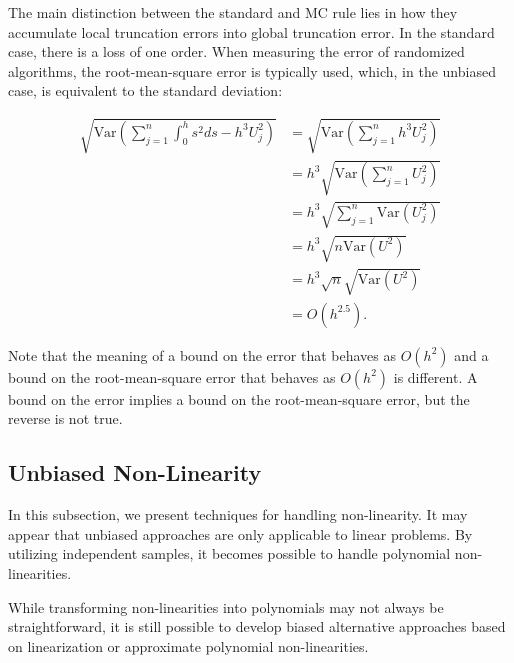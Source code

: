 \documentclass[a4paper,12pt]{article}
\begin{document}
The main distinction between the standard and MC rule lies in how they
accumulate local truncation errors into global truncation error. In the standard
case, there is a loss of one order. When measuring the error of randomized algorithms,
the root-mean-square error is typically used, which, in the unbiased case,
is equivalent to the standard deviation:

\begin{align}
    \sqrt{\text{Var}\left(\sum_{j=1}^{n} \int_{0}^{h} s^{2}ds- h^{3}U_{j}^{2}\right)}
     & =\sqrt{\text{Var}\left(\sum_{j=1}^{n} h^{3}U_{j}^{2}\right)}   \\
     & =h^{3} \sqrt{\text{Var}\left( \sum_{j=1}^{n} U_{j}^{2}\right)} \\
     & =h^{3} \sqrt{ \sum_{j=1}^{n}\text{Var} (U_{j}^{2})}            \\
     & =h^{3} \sqrt{ n \text{Var}(U^{2})}                             \\
     & =h^{3} \sqrt{n} \sqrt{ \text{Var}(U^{2})}                      \\
     & = O(h^{2.5}).
\end{align}

Note that the meaning of a bound on the error that behaves as $O(h^{2})$ and
a bound on the root-mean-square error that behaves as $O(h^{2})$ is different.
A bound on the error implies a bound on the root-mean-square error, but
the reverse is not true.

\subsection{Unbiased Non-Linearity}
In this subsection, we present techniques for handling non-linearity.
It may appear that unbiased approaches are only applicable to linear
problems. By utilizing independent samples, it becomes possible to handle
polynomial non-linearities.

While transforming non-linearities into polynomials may not always be straightforward,
it is still possible to develop biased alternative approaches based on linearization
or approximate polynomial non-linearities.
\end{document}
